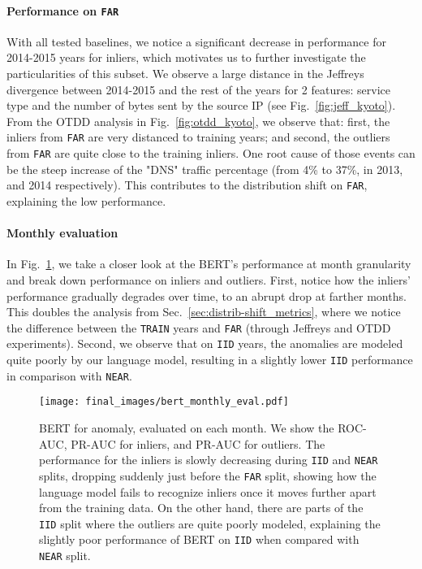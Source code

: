 \documentclass{article}
\begin{document}
\begin{table}[t]
\begin{center}
\begin{tabular}{c l c c c}
\bottomrule
    \end{tabular}
       
    \label{tab:far_near}
\end{center}
\end{table}
\endgroup


    \paragraph{Performance on \texttt{FAR}} With all tested baselines, we notice a significant decrease in performance for 2014-2015 years for inliers, which motivates us to further investigate the particularities of this subset. We observe a large distance in the Jeffreys divergence between 2014-2015 and the rest of the years for 2 features: service type and the number of bytes sent by the source IP (see Fig.~\ref{fig:jeff_kyoto}). From the OTDD analysis in Fig.~\ref{fig:otdd_kyoto}, we observe that: first, the inliers from \texttt{FAR} are very distanced to training years; and second, the outliers from \texttt{FAR} are quite close to the training inliers. One root cause of those events can be the steep increase of the "DNS" traffic percentage (from 4\% to 37\%, in 2013, and 2014 respectively). This contributes to the distribution shift on \texttt{FAR}, explaining the low performance. 

    
    \paragraph{Monthly evaluation} In Fig.~\ref{fig:bert_per_month}, we take a closer look at the BERT's performance at month granularity and break down performance on inliers and outliers. First, notice how the inliers' performance gradually degrades over time, to an abrupt drop at farther months. This doubles the analysis from Sec.~\ref{sec:distrib-shift_metrics}, where we notice the difference between the \texttt{TRAIN} years and \texttt{FAR} (through Jeffreys and OTDD experiments). Second, we observe that on \texttt{IID} years, the anomalies are modeled quite poorly by our language model, resulting in a slightly lower \texttt{IID} performance in comparison with \texttt{NEAR}.
    
\begin{figure}[t]
    \begin{center}
        \texttt{[image: final\_images/bert\_monthly\_eval.pdf]}
    \end{center}
    \caption{BERT for anomaly, evaluated on each month. We show the ROC-AUC, PR-AUC for inliers, and PR-AUC for outliers. The performance for the inliers is slowly decreasing  during \texttt{IID} and \texttt{NEAR} splits, dropping suddenly just before the \texttt{FAR} split, showing how the language model fails to recognize inliers once it moves further apart from the training data. On the other hand, there are parts of the \texttt{IID} split where the outliers are quite poorly modeled, explaining the slightly poor performance of BERT on \texttt{IID} when compared with \texttt{NEAR} split.}
    \label{fig:bert_per_month}
\end{figure}
\end{document}
